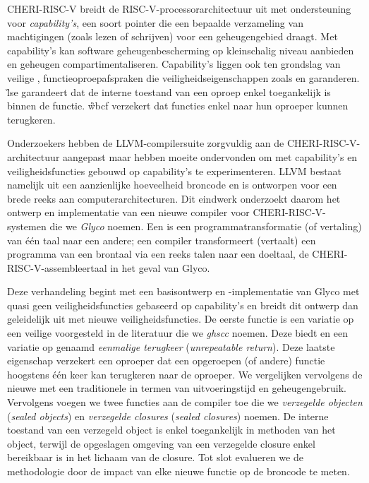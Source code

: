 \documentclass[main.tex]{subfiles}
\begin{document}
\begin{abstract*}
	CHERI-RISC-V breidt de RISC-V-processorarchitectuur uit met ondersteuning voor \emph{capability's}, een soort pointer die een bepaalde verzameling van machtigingen (zoals lezen of schrijven) voor een geheugengebied draagt. Met capability's kan software geheugenbescherming op kleinschalig niveau aanbieden en geheugen compartimentaliseren. Capability's liggen ook ten grondslag van veilige , functieoproepafspraken die veiligheidseigenschappen zoals \emph{} en \emph{} garanderen. \G{lse} garandeert dat de interne toestand van een oproep enkel toegankelijk is binnen de functie. \G{wbcf} verzekert dat functies enkel naar hun oproeper kunnen terugkeren.
	
	Onderzoekers hebben de LLVM-compilersuite zorgvuldig aan de CHERI-RISC-V-architectuur aangepast maar hebben moeite ondervonden om met capability's en veiligheidsfuncties gebouwd op capability's te experimenteren. LLVM bestaat namelijk uit een aanzienlijke hoeveelheid broncode en is ontworpen voor een brede reeks aan computerarchitecturen. Dit eindwerk onderzoekt daarom het ontwerp en implementatie van een nieuwe compiler voor CHERI-RISC-V-systemen die we \emph{Glyco} noemen. Een  is een programmatransformatie (of vertaling) van één taal naar een andere; een compiler transformeert (vertaalt) een programma van een brontaal via een reeks talen naar een doeltaal, de CHERI-RISC-V-assembleertaal in het geval van Glyco.
	
	Deze verhandeling begint met een basisontwerp en -implementatie van Glyco met quasi geen veiligheidsfuncties gebaseerd op capability's en breidt dit ontwerp dan geleidelijk uit met nieuwe veiligheidsfuncties. De eerste functie is een variatie op een veilige  voorgesteld in de literatuur die we \emph{\acrshort{ghscc}} noemen. Deze  biedt  en een variatie op  genaamd \emph{eenmalige terugkeer} (\emph{unrepeatable return}). Deze laatste eigenschap verzekert een oproeper dat een opgeroepen (of andere) functie hoogstens één keer kan terugkeren naar de oproeper. We vergelijken vervolgens de nieuwe  met een traditionele in termen van uitvoeringstijd en geheugengebruik. Vervolgens voegen we twee functies aan de compiler toe die we \emph{verzegelde objecten} (\emph{sealed objects}) en \emph{verzegelde closures} (\emph{sealed closures}) noemen. De interne toestand van een verzegeld object is enkel toegankelijk in methoden van het object, terwijl de opgeslagen omgeving van een verzegelde closure enkel bereikbaar is in het lichaam van de closure. Tot slot evalueren we de methodologie door de impact van elke nieuwe functie op de broncode te meten.
\end{abstract*}

\onlyinsubfile{\mainmatter{}\glsaddall\printglossaries}
\end{document}
